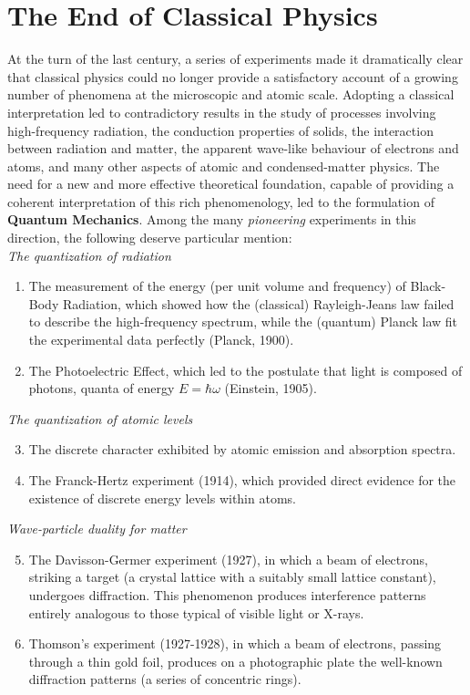 
\chapter{The End of Classical Physics}
At the turn of the last century, a series of experiments made it dramatically clear that classical physics could no longer provide a satisfactory account of a growing number of phenomena at the microscopic and atomic scale. Adopting a classical interpretation led to contradictory results in the study of processes involving high-frequency radiation, the conduction properties of solids, the interaction between radiation and matter, the apparent wave-like behaviour of electrons and atoms, and many other aspects of atomic and condensed-matter physics. The need for a new and more effective theoretical foundation, capable of providing a coherent interpretation of this rich phenomenology, led to the formulation of \textbf{Quantum Mechanics}. Among the many \emph{pioneering} experiments in this direction, the following deserve particular mention: \\

\noindent
\emph{The quantization of radiation}
\begin{enumerate}
    \item The measurement of the energy (per unit volume and frequency) of Black-Body Radiation, which showed how the (classical) Rayleigh-Jeans law failed to describe the high-frequency spectrum, while the (quantum) Planck law fit the experimental data perfectly (Planck, 1900).
    \item The Photoelectric Effect, which led to the postulate that light is composed of photons, quanta of energy $E = \hbar\omega$ (Einstein, 1905).
\end{enumerate}

\noindent \emph{The quantization of atomic levels}
\begin{enumerate}
    \setcounter{enumi}{2}
    \item The discrete character exhibited by atomic emission and absorption spectra.
    \item The Franck-Hertz experiment (1914), which provided direct evidence for the existence of discrete energy levels within atoms.
\end{enumerate}

\noindent \emph{Wave-particle duality for matter}
\begin{enumerate}
    \setcounter{enumi}{4}
    \item The Davisson-Germer experiment (1927), in which a beam of electrons, striking a target (a crystal lattice with a suitably small lattice constant), undergoes diffraction. This phenomenon produces interference patterns entirely analogous to those typical of visible light or X-rays.
    \item Thomson's experiment (1927-1928), in which a beam of electrons, passing through a thin gold foil, produces on a photographic plate the well-known diffraction patterns (a series of concentric rings).
\end{enumerate}

